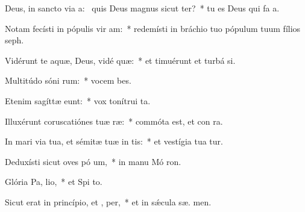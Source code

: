 \item Deus, in sancto via a:~\pscross{} quis Deus magnus sicut  ter?~* tu es Deus qui fa a.
\item Notam fecísti in pópulis vir am:~* redemísti in bráchio tuo pópulum tuum fílios   seph.
\item Vidérunt te aquæ, Deus, vidé  quæ:~* et timuérunt et turbá  si.
\item Multitúdo sóni rum:~* vocem  bes.
\item Etenim sagíttæ  eunt:~* vox tonítrui   ta.
\item Illuxérunt coruscatiónes tuæ  ræ:~* commóta est, et con ra.
\item In mari via tua, et sémitæ tuæ in  tis:~* et vestígia tua  tur.
\item Deduxísti sicut oves pó um,~* in manu Mó  ron.
\item Glória Pa,  lio,~* et Spi to.
\item Sicut erat in princípio, et ,  per,~* et in sǽcula sæ. men.
